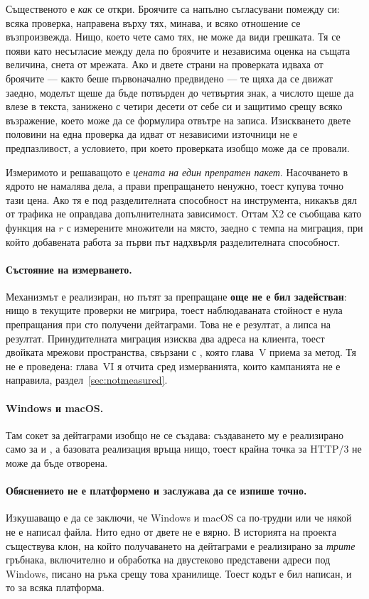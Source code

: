 Същественото е \emph{как} се откри. Броячите са напълно съгласувани помежду си: всяка проверка,
направена върху тях, минава, и всяко отношение се възпроизвежда. Нищо, което чете само тях, не може
да види грешката. Тя се появи като несъгласие между дела по броячите и независима оценка на същата
величина, снета от мрежата. Ако и двете страни на проверката идваха от броячите — както беше
първоначално предвидено — те щяха да се движат заедно, моделът щеше да бъде потвърден до четвъртия
знак, а числото щеше да влезе в текста, занижено с четири десети от себе си и защитимо срещу всяко
възражение, което може да се формулира отвътре на записа. Изискването двете половини на една проверка
да идват от независими източници не е предпазливост, а условието, при което проверката изобщо може да
се провали.

Измеримото и решаващото е \emph{цената на един препратен пакет}. Насочването в ядрото не намалява
дела, а прави препращането ненужно, тоест купува точно тази цена. Ако тя е под разделителната
способност на инструмента, никакъв дял от трафика не оправдава допълнителната зависимост. Оттам X2 се
съобщава като функция на \(r\) с измерените множители на място, заедно с темпа на миграция, при който
добавената работа за първи път надхвърля разделителната способност.

\paragraph{Състояние на измерването.} Механизмът е реализиран, но пътят за препращане
\textbf{още не е бил задействан}: нищо в текущите проверки не мигрира, тоест наблюдаваната
стойност е нула препращания при сто получени дейтаграми. Това не е резултат, а липса на
резултат. Принудителната миграция изисква два адреса на клиента, тоест двойката мрежови
пространства, свързани с , която глава~V приема за метод. Тя не е проведена:
глава~VI я отчита сред измерванията, които кампанията не е направила,
раздел~\ref{sec:notmeasured}.

\paragraph{Windows и macOS.} Там сокет за дейтаграми изобщо не се създава: създаването му е
реализирано само за  и , а базовата реализация връща нищо, тоест
крайна точка за HTTP/3 не може да бъде отворена.

\paragraph{Обяснението не е платформено и заслужава да се изпише точно.} Изкушаващо е да се
заключи, че Windows и macOS са по-трудни или че някой не е написал файла. Нито едно от двете не е
вярно. В историята на проекта съществува клон, на който получаването на дейтаграми е реализирано за
\emph{трите} гръбнака, включително  и обработка на двустеково представени адреси
под Windows, писано на ръка срещу това хранилище. Тоест кодът е бил написан, и то за всяка платформа.

